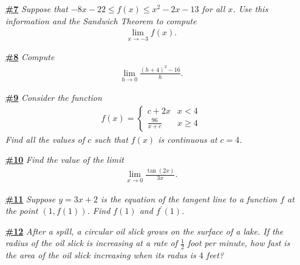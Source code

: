 \documentclass[a4paper,12pt]{article} %
\theoremstyle{plain}
\theoremstyle{definition}
\newcommand{\p}{^\prime}
\begin{document}
\begin{enumerate}
\newpage
\item[\underline{\textbf{\#7}}] \textit{Suppose that $-8x -22\le f(x) \le x^2 -2x -13$ for all $x$. Use this information and the Sandwich Theorem to compute 
  \begin{align*}
    \lim_{x\to -3} f(x).
  \end{align*}}
\newpage
\item[\underline{\textbf{\#8}}] \textit{Compute
  \begin{align*}
    \lim_{h\to 0} \frac{(h+4)^2 -16}{h}.
  \end{align*}}
\newpage
\item[\underline{\textbf{\#9}}] \textit{ Consider the function
  \begin{align*}
    f(x) = \begin{cases}
        c + 2x & x < 4 \\
        \frac{96}{x + c} & x \ge 4
    \end{cases}
  \end{align*}
Find all the values of $c$ such that $f(x)$ is continuous at $c = 4$.}
\newpage
\item[\underline{\textbf{\#10}}] \textit{Find the value of the limit 
  \begin{align*}
  \lim_{x \to 0} \frac{\tan(2x)}{3x}.
  \end{align*}}
\newpage
\item[\underline{\textbf{\#11}}] \textit{Suppose $y = 3x +2$ is the equation of the tangent line to a function $f$ at the point $(1,f(1))$. Find $f(1)$ and $f\p(1)$.}
\newpage

\item[\underline{\textbf{\#12}}] \textit{After a spill, a circular oil slick grows on the surface of a lake.  If the radius of the oil slick is increasing at a rate of $\frac{1}{2}$ foot per minute, how fast is the area of the oil slick increasing when its radus is $4$ feet?}
\newpage
\end{enumerate}
\end{document}
